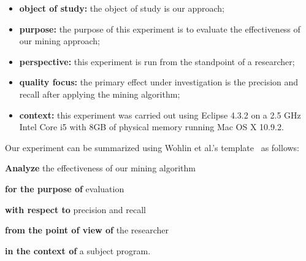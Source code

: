 \begin{itemize}

\item \textbf{object of study:} the object of study is our approach; 

\item \textbf{purpose:} the purpose of this experiment is to evaluate the effectiveness of our mining approach; %

\item \textbf{perspective:} this experiment is run from the standpoint of a researcher;

\item \textbf{quality focus:} the primary effect under investigation is the precision and recall after applying the mining algorithm; 

\item  \textbf{context:} this experiment was carried out using Eclipse 4.3.2 on a 2.5 GHz Intel Core i5 with 8GB of physical memory running Mac OS X 10.9.2.
\end{itemize}

%

Our experiment can be summarized using Wohlin et al.'s template~\cite{Wohlin} as follows: 

\textbf{Analyze} the effectiveness of our mining algorithm

\textbf{for the purpose of} evaluation

\textbf{with respect to} precision and recall

\textbf{from the point of view of} the researcher

\textbf{in the context of} a subject program. 

